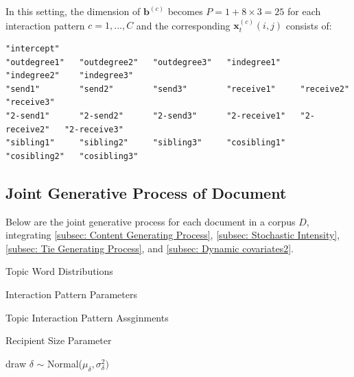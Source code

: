 \documentclass[a4paper]{article}
\begin{document}
In this setting, the dimension of  $\boldsymbol{b}^{(c)}$ becomes $P =  1 + 8 \times 3= 25$ for each interaction pattern $c=1,...,C$ and the corresponding $\boldsymbol{x}^{(c)}_{t}(i, j)$ consists of:
\begin{verbatim}
"intercept"    
"outdegree1"   "outdegree2"   "outdegree3"   "indegree1"    "indegree2"    "indegree3"   
"send1"        "send2"        "send3"        "receive1"     "receive2"     "receive3"     
"2-send1"      "2-send2"      "2-send3"      "2-receive1"   "2-receive2"   "2-receive3"  
"sibling1"     "sibling2"     "sibling3"     "cosibling1"   "cosibling2"   "cosibling3"   
\end{verbatim}
\subsection{Joint Generative Process of Document} \label{subsec: Joint Generative Process of Document}
 Below are the joint generative process for each document in a corpus $D$, integrating \ref{subsec: Content Generating Process}, \ref{subsec: Stochastic Intensity}, \ref{subsec: Tie Generating Process}, and \ref{subsec: Dynamic covariates2}.  
\begin{algorithm}[H]
	\SetAlgoLined
	\caption{Topic Word Distributions}
\end{algorithm}
\begin{algorithm}[H]
	\SetAlgoLined
	\caption{Interaction Pattern Parameters}
\end{algorithm}
\begin{algorithm}[H]
	\SetAlgoLined
	\caption{Topic Interaction Pattern Assginments}
\end{algorithm}
\begin{algorithm}[H]
	\SetAlgoLined
	\caption{Recipient Size Parameter}
		draw $\delta$ $\sim$ Normal($\mu_\delta, \sigma^2_\delta)$
\end{algorithm}
\end{document}
